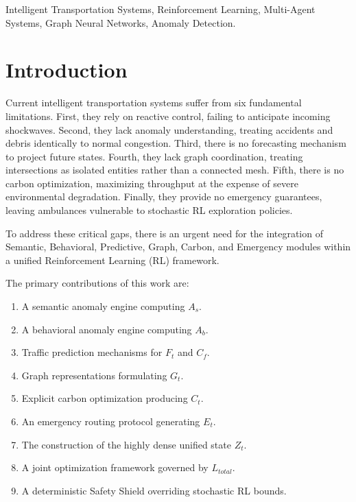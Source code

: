 \documentclass{ieeeaccess}
\begin{document}
\begin{keywords}
Intelligent Transportation Systems, Reinforcement Learning, Multi-Agent Systems, Graph Neural Networks, Anomaly Detection.
\end{keywords}

\titlepgskip=-15pt
\maketitle

\section{Introduction}
\label{sec:introduction}
Current intelligent transportation systems suffer from six fundamental limitations. First, they rely on reactive control, failing to anticipate incoming shockwaves. Second, they lack anomaly understanding, treating accidents and debris identically to normal congestion. Third, there is no forecasting mechanism to project future states. Fourth, they lack graph coordination, treating intersections as isolated entities rather than a connected mesh. Fifth, there is no carbon optimization, maximizing throughput at the expense of severe environmental degradation. Finally, they provide no emergency guarantees, leaving ambulances vulnerable to stochastic RL exploration policies.

To address these critical gaps, there is an urgent need for the integration of Semantic, Behavioral, Predictive, Graph, Carbon, and Emergency modules within a unified Reinforcement Learning (RL) framework.

The primary contributions of this work are:
\begin{enumerate}
    \item A semantic anomaly engine computing $A_s$.
    \item A behavioral anomaly engine computing $A_b$.
    \item Traffic prediction mechanisms for $F_t$ and $C_f$.
    \item Graph representations formulating $G_t$.
    \item Explicit carbon optimization producing $C_t$.
    \item An emergency routing protocol generating $E_t$.
    \item The construction of the highly dense unified state $Z_t$.
    \item A joint optimization framework governed by $L_{total}$.
    \item A deterministic Safety Shield overriding stochastic RL bounds.
\end{enumerate}
\end{document}
